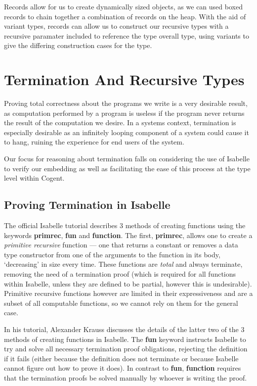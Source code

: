 Records allow for us to create dynamically sized objects, as we can used boxed records to chain together a
combination of records on the heap. With the aid of variant types, records can allow us to construct our recursive 
types with a recursive paramater included to reference the type overall type, using variants to give the 
differing construction cases for the type.

\section{Termination And Recursive Types}

Proving total correctness about the programs we write is a very desirable result,
as computation performed by a program is useless if the program never returns the
result of the computation we desire.
In a systems context, termination is especially desirable as an infinitely looping component of a
system could cause it to hang, ruining the experience for end users of the system.

Our focus for reasoning about termination falls on considering the use of Isabelle to verify our 
embedding as well as facilitating the ease of this process at the type level within Cogent. 

\subsection{Proving Termination in Isabelle}


The official Isabelle tutorial\citep{IsabelleTutorial} describes 3 methods of creating functions using the keywords 
\textbf{primrec}, \textbf{fun} and \textbf{function}. The first, \textbf{primrec}, allows one to create a 
\textit{primitive recursive} function --- one that returns a constant or removes a data type constructor from one
of the arguments to the function in its body, `decreasing' in size every time. These functions are \textit{total}
and always terminate, removing the need of a termination proof (which is required for all functions within Isabelle,
unless they are defined to be partial, however this is undesirable).
Primitive recursive functions however are limited in their expressiveness and are a subset of all computable
functions, so we cannot rely on them for the general case.

In his tutorial\citep{KraussIsabelle}, Alexander Krauss discusses the details of the latter two of the 3 methods
of creating functions in Isabelle. The \textbf{fun} keyword instructs Isabelle to try and solve all necessary
termination proof obligations, rejecting the definition if it fails (either because the definition does not 
terminate or because Isabelle cannot figure out how to prove it does). In contrast to \textbf{fun}, \textbf{function}
requires that the termination proofs be solved manually by whoever is writing the proof.

